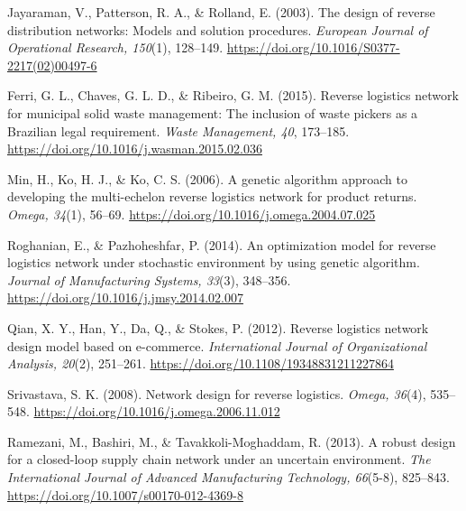 \newpage %
\begin{thebibliography}{99} %

Jayaraman, V., Patterson, R. A., \& Rolland, E. (2003). The design of reverse distribution networks: Models and solution procedures. \textit{European Journal of Operational Research, 150}(1), 128--149. \href{https://doi.org/10.1016/S0377-2217(02)00497-6}{https://doi.org/10.1016/S0377-2217(02)00497-6}

Ferri, G. L., Chaves, G. L. D., \& Ribeiro, G. M. (2015). Reverse logistics network for municipal solid waste management: The inclusion of waste pickers as a Brazilian legal requirement. \textit{Waste Management, 40}, 173--185. \href{https://doi.org/10.1016/j.wasman.2015.02.036}{https://doi.org/10.1016/j.wasman.2015.02.036}

Min, H., Ko, H. J., \& Ko, C. S. (2006). A genetic algorithm approach to developing the multi-echelon reverse logistics network for product returns. \textit{Omega, 34}(1), 56--69. \href{https://doi.org/10.1016/j.omega.2004.07.025}{https://doi.org/10.1016/j.omega.2004.07.025}

Roghanian, E., \& Pazhoheshfar, P. (2014). An optimization model for reverse logistics network under stochastic environment by using genetic algorithm. \textit{Journal of Manufacturing Systems, 33}(3), 348--356. \href{https://doi.org/10.1016/j.jmsy.2014.02.007}{https://doi.org/10.1016/j.jmsy.2014.02.007}

Qian, X. Y., Han, Y., Da, Q., \& Stokes, P. (2012). Reverse logistics network design model based on e-commerce. \textit{International Journal of Organizational Analysis, 20}(2), 251--261. \href{https://doi.org/10.1108/19348831211227864}{https://doi.org/10.1108/19348831211227864}

Srivastava, S. K. (2008). Network design for reverse logistics. \textit{Omega, 36}(4), 535--548. \href{https://doi.org/10.1016/j.omega.2006.11.012}{https://doi.org/10.1016/j.omega.2006.11.012}

Ramezani, M., Bashiri, M., \& Tavakkoli-Moghaddam, R. (2013). A robust design for a closed-loop supply chain network under an uncertain environment. \textit{The International Journal of Advanced Manufacturing Technology, 66}(5-8), 825--843. \href{https://doi.org/10.1007/s00170-012-4369-8}{https://doi.org/10.1007/s00170-012-4369-8}


\end{thebibliography}

